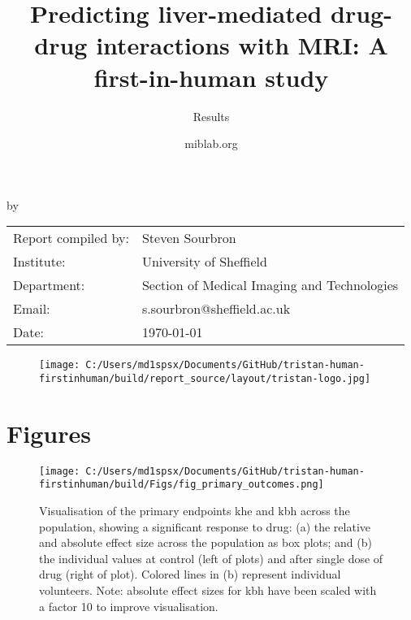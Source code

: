 \documentclass{epflreport}%
\begin{document}
%
\normalsize%
\frontmatter%
\title{Predicting liver{-}mediated drug{-}drug interactions with MRI: A first{-}in{-}human study}%
\subtitle{Results}%
\author{miblab.org}%
\subject{Internal report}%
%
%
%
\makecover%
\begin{titlepage}%
\begin{center}%
\makeatletter%
\largetitlestyle\fontsize{45}{45}\selectfont\@title%
\makeatother%
\linebreak%
\makeatletter%
\ifdefvoid{\@subtitle}{}{\bigskip\titlestyle\fontsize{20}{20}\selectfont\@subtitle}%
\makeatother%
\linebreak%
\bigskip%
\bigskip%
by%
\linebreak%
\bigskip%
\bigskip%
\makeatletter%
\largetitlestyle\fontsize{25}{25}\selectfont\@author%
\makeatother%
\vfill%
\large%
\begin{tabular}{ll}%
\hline%
Report compiled by: &Steven Sourbron\\%
Institute: &University of Sheffield\\%
Department: &Section of Medical Imaging and Technologies\\%
Email: &s.sourbron@sheffield.ac.uk\\%
Date: &\today\\%
\hline%
\end{tabular}%


\begin{figure}[b!]%
\centering%
\centering%
\texttt{[image: C:/Users/md1spsx/Documents/GitHub/tristan-human-firstinhuman/build/report\_source/layout/tristan-logo.jpg]}%
\end{figure}

%
\end{center}%
\end{titlepage}%
\newpage%
\tableofcontents%
\mainmatter%
\clearpage%
\chapter{Figures}%
\clearpage%


\begin{figure}[h!]%
\centering%
\texttt{[image: C:/Users/md1spsx/Documents/GitHub/tristan-human-firstinhuman/build/Figs/fig\_primary\_outcomes.png]}%
\caption{Visualisation of the primary endpoints khe and kbh across the population, showing a significant response to drug: (a) the relative and absolute effect size across the population as box plots; and (b) the individual values at control (left of plots) and after single dose of drug (right of plot). Colored lines in (b) represent individual volunteers. Note: absolute effect sizes for kbh have been scaled with a factor 10 to improve visualisation.}%
\end{figure}
\end{document}

